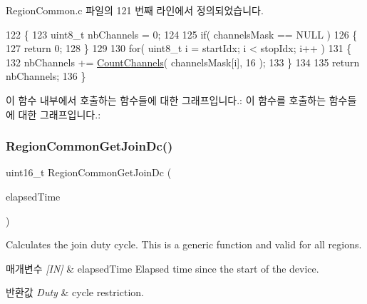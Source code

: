 Region\+Common.\+c 파일의 121 번째 라인에서 정의되었습니다.


\begin{DoxyCode}
122 \{
123     uint8\_t nbChannels = 0;
124 
125     \textcolor{keywordflow}{if}( channelsMask == NULL )
126     \{
127         \textcolor{keywordflow}{return} 0;
128     \}
129 
130     \textcolor{keywordflow}{for}( uint8\_t i = startIdx; i < stopIdx; i++ )
131     \{
132         nbChannels += \mbox{\hyperlink{_region_common_8c_aef7feee8e47f43eb01f62249bfcc2a06}{CountChannels}}( channelsMask[i], 16 );
133     \}
134 
135     \textcolor{keywordflow}{return} nbChannels;
136 \}
\end{DoxyCode}
이 함수 내부에서 호출하는 함수들에 대한 그래프입니다.\+:
이 함수를 호출하는 함수들에 대한 그래프입니다.\+:
\mbox{\label{group___r_e_g_i_o_n_c_o_m_m_o_n_ga672466fcf1aedaaf075cdabf49bc0c28}} 
\subsubsection{\texorpdfstring{Region\+Common\+Get\+Join\+Dc()}{RegionCommonGetJoinDc()}}
{\footnotesize\ttfamily uint16\+\_\+t Region\+Common\+Get\+Join\+Dc (\begin{DoxyParamCaption}\item[{\mbox{\hyperlink{utilities_8h_a4215ca43d3e953099ea758ce428599d0}{Timer\+Time\+\_\+t}}}]{elapsed\+Time }\end{DoxyParamCaption})}



Calculates the join duty cycle. This is a generic function and valid for all regions. 


\begin{DoxyParams}{매개변수}
{\em \mbox{[}\+I\+N\mbox{]}} & elapsed\+Time Elapsed time since the start of the device.\\
\hline
\end{DoxyParams}

\begin{DoxyRetVals}{반환값}
{\em Duty} & cycle restriction. \\
\hline
\end{DoxyRetVals}


